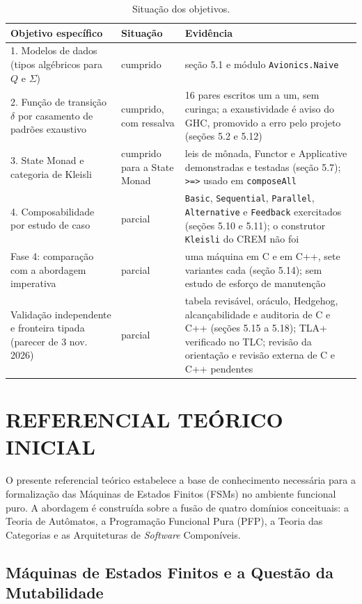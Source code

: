\documentclass[12pt,a4paper]{article}
\begin{document}
\begin{table}[h]
\centering
\footnotesize
\begin{tabular}{|p{4.3cm}|p{2.1cm}|p{8.0cm}|}
\hline
Objetivo específico & Situação & Evidência \\
\hline
1. Modelos de dados (tipos algébricos para $Q$ e $\Sigma$) & cumprido & seção 5.1 e módulo \texttt{Avionics.Naive} \\
\hline
2. Função de transição $\delta$ por casamento de padrões exaustivo & cumprido, com ressalva & 16 pares escritos um a um, sem curinga; a exaustividade é aviso do GHC, promovido a erro pelo projeto (seções 5.2 e 5.12) \\
\hline
3. State Monad e categoria de Kleisli & cumprido para a State Monad & leis de mônada, Functor e Applicative demonstradas e testadas (seção 5.7); \texttt{>=>} usado em \texttt{composeAll} \\
\hline
4. Composabilidade por estudo de caso & parcial & \texttt{Basic}, \texttt{Sequential}, \texttt{Parallel}, \texttt{Alternative} e \texttt{Feedback} exercitados (seções 5.10 e 5.11); o construtor \texttt{Kleisli} do CREM não foi \\
\hline
Fase 4: comparação com a abordagem imperativa & parcial & uma máquina em C e em C++, sete variantes cada (seção 5.14); sem estudo de esforço de manutenção \\
\hline
Validação independente e fronteira tipada (parecer de 3 nov. 2026) & parcial & tabela revisável, oráculo, Hedgehog, alcançabilidade e auditoria de C e C++ (seções 5.15 a 5.18); TLA+ verificado no TLC; revisão da orientação e revisão externa de C e C++ pendentes \\
\hline
\end{tabular}
\caption{Situação dos objetivos.}
\label{tab:objetivos}
\end{table}

\section{REFERENCIAL TEÓRICO INICIAL}
O presente referencial teórico estabelece a base de conhecimento necessária para a formalização das Máquinas de Estados Finitos (FSMs) no ambiente funcional puro. A abordagem é construída sobre a fusão de quatro domínios conceituais: a Teoria de Autômatos, a Programação Funcional Pura (PFP), a Teoria das Categorias e as Arquiteturas de \textit{Software} Componíveis.

\subsection{Máquinas de Estados Finitos e a Questão da Mutabilidade}
\end{document}
